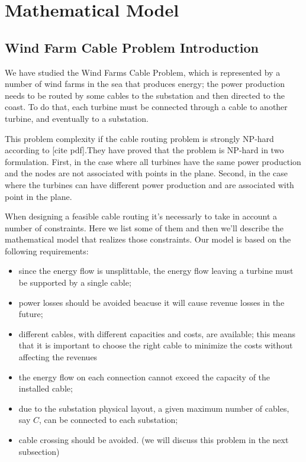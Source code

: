 
\chapter{Mathematical Model}
\label{chp:2-Model}

\section{Wind Farm Cable Problem Introduction}We have studied the Wind Farms Cable Problem, which is represented by a number of wind farms in the sea that produces energy; the power production needs to be routed by some cables to the substation and then directed to the coast.
To do that, each turbine must be connected through a cable to another turbine, and eventually to a substation.

This problem complexity if the cable routing problem is strongly NP-hard according to [cite pdf].They have proved that the problem is NP-hard in two formulation. First, in the case where all turbines have the same power production and the nodes are not associated with points in the plane. Second, in the case where the turbines can have different power production and are associated with point in the plane. 

When designing a feasible cable routing it's necessarly to take in account a number of constraints. Here we list some of them and then we'll describe the mathematical model that realizes those constraints. Our model is based on the following requirements:

\begin{itemize}
\item since the energy flow is unsplittable, the energy flow leaving a turbine must be supported by a single cable; 
\item power losses should be avoided beacuse it will cause revenue losses in the future;
\item different cables, with different capacities and costs, are available; this means that it is important to choose the right cable to minimize the costs without affecting the revenues 
\item the energy flow on each connection cannot exceed the capacity of the installed cable;
\item due to the substation physical layout, a given maximum number of cables, say $C$, can be connected to each substation; 
\item cable crossing should be avoided. (we will discuss this problem in the next subsection)
\end{itemize}

